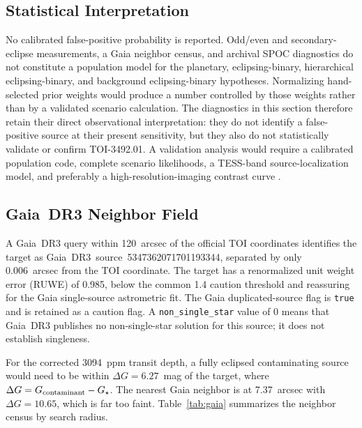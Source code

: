 \documentclass[11pt]{article}
\begin{document}
\subsection{Statistical Interpretation}

No calibrated false-positive probability is reported.  Odd/even and
secondary-eclipse measurements, a Gaia neighbor census, and archival SPOC
diagnostics do not constitute a population model for the planetary,
eclipsing-binary, hierarchical eclipsing-binary, and background eclipsing-binary
hypotheses.  Normalizing
hand-selected prior weights would produce a number controlled by those
weights rather than by a validated scenario calculation.  The diagnostics
in this section therefore retain their direct observational interpretation:
they do not identify a false-positive source at their present sensitivity, but
they also do not statistically validate or confirm TOI-3492.01.  A validation analysis would require a
calibrated population code, complete scenario likelihoods, a TESS-band
source-localization model, and preferably a high-resolution-imaging contrast
curve \citep{Morton2012,Morton2016,Giacalone2021}.

\subsection{Gaia~DR3 Neighbor Field}

A Gaia~DR3 \citep{Vallenari2023} query within 120~arcsec of the official TOI coordinates
identifies the target as Gaia~DR3~source~5347362071701193344, separated by
only 0.006~arcsec from the TOI coordinate.  The target has a renormalized unit
weight error (RUWE) of 0.985, below the common 1.4 caution threshold and
reassuring for the Gaia single-source astrometric fit.  The Gaia
duplicated-source flag is \texttt{true} and is retained as a caution flag.  A
\texttt{non\_single\_star} value of 0 means that Gaia~DR3 publishes no
non-single-star solution for this source; it does not establish singleness.

For the corrected 3094~ppm transit depth, a fully eclipsed contaminating
source would need to be within $\Delta G = 6.27$~mag of the target, where
$\Delta G=G_{\rm contaminant}-G_\star$.  The
nearest Gaia neighbor is at 7.37~arcsec with $\Delta G = 10.65$, which is
far too faint.  Table~\ref{tab:gaia} summarizes the neighbor census by
search radius.
\end{document}

